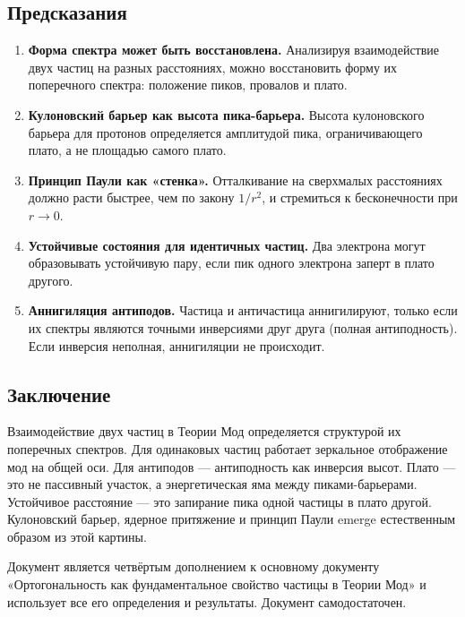 \documentclass[12pt,a4paper]{article}
\begin{document}
\subsection{Предсказания}
\begin{enumerate}[label=\arabic*.]
    \item \textbf{Форма спектра может быть восстановлена.} Анализируя взаимодействие двух частиц на разных расстояниях, можно восстановить форму их поперечного спектра: положение пиков, провалов и плато.
    \item \textbf{Кулоновский барьер как высота пика-барьера.} Высота кулоновского барьера для протонов определяется амплитудой пика, ограничивающего плато, а не площадью самого плато.
    \item \textbf{Принцип Паули как «стенка».} Отталкивание на сверхмалых расстояниях должно расти быстрее, чем по закону $1/r^2$, и стремиться к бесконечности при $r \to 0$.
    \item \textbf{Устойчивые состояния для идентичных частиц.} Два электрона могут образовывать устойчивую пару, если пик одного электрона заперт в плато другого.
    \item \textbf{Аннигиляция антиподов.} Частица и античастица аннигилируют, только если их спектры являются точными инверсиями друг друга (полная антиподность). Если инверсия неполная, аннигиляции не происходит.
\end{enumerate}

\subsection{Заключение}
Взаимодействие двух частиц в Теории Мод определяется структурой их поперечных спектров. Для одинаковых частиц работает зеркальное отображение мод на общей оси. Для антиподов --- антиподность как инверсия высот. Плато --- это не пассивный участок, а энергетическая яма между пиками-барьерами. Устойчивое расстояние --- это запирание пика одной частицы в плато другой. Кулоновский барьер, ядерное притяжение и принцип Паули emerge естественным образом из этой картины.

Документ является четвёртым дополнением к основному документу «Ортогональность как фундаментальное свойство частицы в Теории Мод» и использует все его определения и результаты. Документ самодостаточен.

\end{document}
